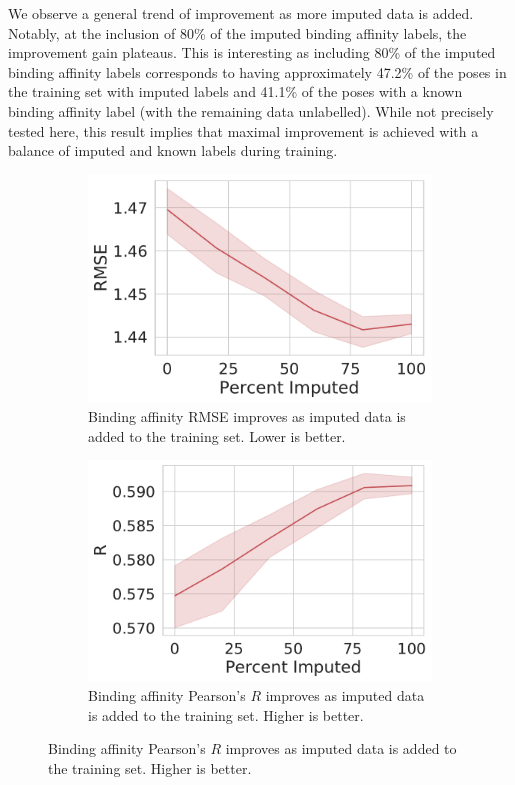 \documentclass[journal=jcim,manuscript=article]{achemso}
\begin{document}
We observe a general trend of improvement as more imputed data is added.
Notably, at the inclusion of 80\% of the imputed binding affinity labels, the improvement gain plateaus.
This is interesting as including 80\% of the imputed binding affinity labels corresponds to having approximately 47.2\% of the poses in the training set with imputed labels and 41.1\% of the poses with a known binding affinity label (with the remaining data unlabelled).
While not precisely tested here, this result implies that maximal improvement is achieved with a balance of imputed and known labels during training.

\begin{figure}[tbph]
    \centering
    \begin{subfigure}[t]{0.48\textwidth}
        \centering
        \includegraphics[width=\linewidth]{figures/MedGOEns_addingImpRMSE.pdf}
        \caption{Binding affinity RMSE improves as imputed data is added to the training set. Lower is better.}
    \end{subfigure}
    \hfill
    \begin{subfigure}[t]{0.48\textwidth}
        \centering
        \includegraphics[width=\linewidth]{figures/MedGOEns_addingImpR.pdf}
        \caption{Binding affinity Pearson's $R$ improves as imputed data is added to the training set. Higher is better.}
    \end{subfigure}


\end{figure}
\end{document}

